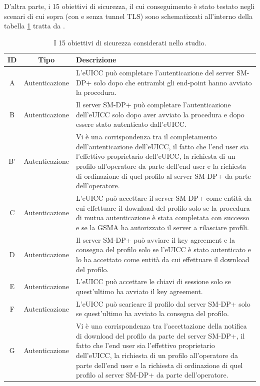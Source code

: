 \documentclass[10pt, oneside]{book}
\begin{document}
D'altra parte, i 15 obiettivi di sicurezza, il cui conseguimento è stato testato negli scenari di cui sopra (con e senza tunnel TLS) sono schematizzati all'interno della tabella \ref{tab:security-goals} tratta da \cite{Sec-analysis}.
\begin{table}[h!]
\begin{center}
\captionsetup{skip=4pt}
\caption{I 15 obiettivi di sicurezza considerati nello studio.}
\label{tab:security-goals}
\begin{tabularx}{\textwidth}{|c|c|X|} %
\hline
\textbf{ID} & \textbf{Tipo} & \textbf{Descrizione}\\
\hline
A & Autenticazione & L'eUICC può completare l'autenticazione del server SM-DP+ solo dopo che entrambi gli end-point hanno avviato la procedura.\\
\hline
B & Autenticazione & Il server SM-DP+ può completare l'autenticazione dell'eUICC solo dopo aver avviato la procedura e dopo essere stato autenticato dall'eUICC.\\
\hline
B' & Autenticazione & Vi è una corrispondenza tra il completamento dell'autenticazione dell'eUICC, il fatto che l'end user sia l'effettivo proprietario dell'eUICC, la richiesta di un profilo all'operatore da parte dell'end user e la richiesta di ordinazione di quel profilo al server SM-DP+ da parte dell'operatore.\\
\hline
C & Autenticazione & L'eUICC può accettare il server SM-DP+ come entità da cui effettuare il download del profilo solo se la procedura di mutua autenticazione è stata completata con successo e se la GSMA ha autorizzato il server a rilasciare profili.\\
\hline
D & Autenticazione & Il server SM-DP+ può avviare il key agreement e la consegna del profilo solo se l'eUICC è stato autenticato e lo ha accettato come entità da cui effettuare il download del profilo.\\
\hline
E & Autenticazione & L'eUICC può accettare le chiavi di sessione solo se quest'ultimo ha avviato il key agreement.\\
\hline
F & Autenticazione & L'eUICC può scaricare il profilo dal server SM-DP+ solo se quest'ultimo ha avviato la consegna del profilo.\\
\hline
G & Autenticazione & Vi è una corrispondenza tra l'accettazione della notifica di download del profilo da parte del server SM-DP+, il fatto che l'end user sia l'effettivo proprietario dell'eUICC, la richiesta di un profilo all'operatore da parte dell'end user e la richiesta di ordinazione di quel profilo al server SM-DP+ da parte dell'operatore.\\

\end{tabularx}
\end{center}
\end{table}
\end{document}
